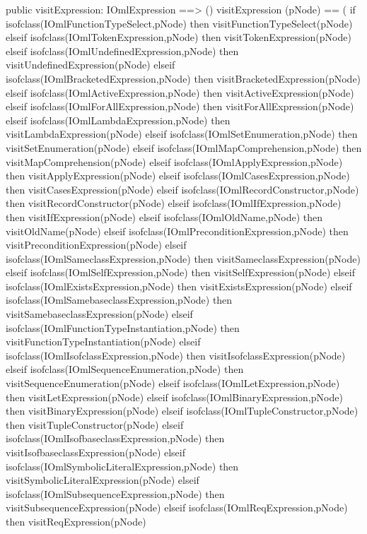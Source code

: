\begin{vdm_al}
  public visitExpression: IOmlExpression ==> ()
  visitExpression (pNode) ==
    ( if isofclass(IOmlFunctionTypeSelect,pNode) then visitFunctionTypeSelect(pNode)
      elseif isofclass(IOmlTokenExpression,pNode) then visitTokenExpression(pNode)
      elseif isofclass(IOmlUndefinedExpression,pNode) then visitUndefinedExpression(pNode)
      elseif isofclass(IOmlBracketedExpression,pNode) then visitBracketedExpression(pNode)
      elseif isofclass(IOmlActiveExpression,pNode) then visitActiveExpression(pNode)
      elseif isofclass(IOmlForAllExpression,pNode) then visitForAllExpression(pNode)
      elseif isofclass(IOmlLambdaExpression,pNode) then visitLambdaExpression(pNode)
      elseif isofclass(IOmlSetEnumeration,pNode) then visitSetEnumeration(pNode)
      elseif isofclass(IOmlMapComprehension,pNode) then visitMapComprehension(pNode)
      elseif isofclass(IOmlApplyExpression,pNode) then visitApplyExpression(pNode)
      elseif isofclass(IOmlCasesExpression,pNode) then visitCasesExpression(pNode)
      elseif isofclass(IOmlRecordConstructor,pNode) then visitRecordConstructor(pNode)
      elseif isofclass(IOmlIfExpression,pNode) then visitIfExpression(pNode)
      elseif isofclass(IOmlOldName,pNode) then visitOldName(pNode)
      elseif isofclass(IOmlPreconditionExpression,pNode) then visitPreconditionExpression(pNode)
      elseif isofclass(IOmlSameclassExpression,pNode) then visitSameclassExpression(pNode)
      elseif isofclass(IOmlSelfExpression,pNode) then visitSelfExpression(pNode)
      elseif isofclass(IOmlExistsExpression,pNode) then visitExistsExpression(pNode)
      elseif isofclass(IOmlSamebaseclassExpression,pNode) then visitSamebaseclassExpression(pNode)
      elseif isofclass(IOmlFunctionTypeInstantiation,pNode) then visitFunctionTypeInstantiation(pNode)
      elseif isofclass(IOmlIsofclassExpression,pNode) then visitIsofclassExpression(pNode)
      elseif isofclass(IOmlSequenceEnumeration,pNode) then visitSequenceEnumeration(pNode)
      elseif isofclass(IOmlLetExpression,pNode) then visitLetExpression(pNode)
      elseif isofclass(IOmlBinaryExpression,pNode) then visitBinaryExpression(pNode)
      elseif isofclass(IOmlTupleConstructor,pNode) then visitTupleConstructor(pNode)
      elseif isofclass(IOmlIsofbaseclassExpression,pNode) then visitIsofbaseclassExpression(pNode)
      elseif isofclass(IOmlSymbolicLiteralExpression,pNode) then visitSymbolicLiteralExpression(pNode)
      elseif isofclass(IOmlSubsequenceExpression,pNode) then visitSubsequenceExpression(pNode)
      elseif isofclass(IOmlReqExpression,pNode) then visitReqExpression(pNode)

\end{vdm_al}

